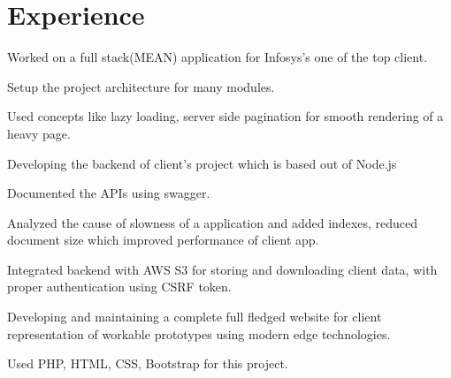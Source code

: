 \documentclass[]{deedy-resume-openfont}
\begin{document}
\begin{minipage}[t]{0.60\textwidth} 


\section{Experience}

\vspace{\topsep} %
\begin{tightemize}
\item Worked on a full stack(MEAN) application for Infosys's one of the top client.
\item Setup the project architecture for many modules.
\item Used concepts like lazy loading, server side pagination for smooth rendering of a heavy page.
\end{tightemize}
\sectionsep

\begin{tightemize}
\item Developing the backend of client's project which is based out of Node.js
\item Documented the APIs using swagger.
\item Analyzed the cause of slowness of a application and added indexes, reduced document size which improved performance of client app.
\item Integrated backend with AWS S3 for storing and downloading client data, with proper authentication using CSRF token.
\end{tightemize}
\sectionsep

\begin{tightemize}
\item Developing and maintaining a complete full fledged website for client representation of workable prototypes using modern edge technologies.
\item Used PHP, HTML, CSS, Bootstrap for this project.
\end{tightemize}
\sectionsep



\end{minipage}
\end{document}
